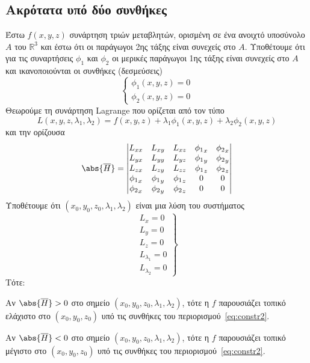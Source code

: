 \documentclass[a4paper,table]{report}
\begin{document}
\subsection{Ακρότατα υπό δύο συνθήκες}


\begin{thm}
  Έστω $ f(x,y,z) $ συνάρτηση τριών μεταβλητών, ορισμένη σε ένα ανοιχτό 
  υποσύνολο $A$ του $ \mathbb{R}^{3} $ και έστω ότι οι παράγωγοι 2ης τάξης είναι 
  συνεχείς στο $A$. Υποθέτουμε ότι για τις συναρτήσεις $ \phi _{1} $ και 
  $ \phi _{2} $ οι μερικές παράγωγοι 1ης τάξης είναι συνεχείς στο $A$ και 
  ικανοποιούνται οι συνθήκες (δεσμεύσεις) 
  \[
    \begin{cases}\label{eq:constr2}
      \phi_{1} (x,y,z) = 0 \\
      \phi_{2} (x,y,z) = 0 
    \end{cases} 
  \] 
  Θεωρούμε τη συνάρτηση Lagrange που ορίζεται από τον τύπο
  \[
    L(x,y,z, \lambda _{1}, \lambda _{2}) = f(x,y,z) + \lambda _{1} 
    \phi _{1}(x,y,z) + \lambda _{2} \phi _{2}(x,y,z) 
  \] 
  και την ορίζουσα 
  \[
    \abs{\overline{H}} = 
    \begin{vmatrix}
      L_{xx} & L_{xy} & L_{xz} & {\phi _{1}}_{x} & {\phi _{2}}_{x} \\
      L_{yx} & L_{yy} & L_{yz} & {\phi _{1}}_{y} & {\phi _{2}}_{y} \\
      L_{zx} & L_{zy} & L_{zz} & {\phi _{1}}_{z} & {\phi _{2}}_{z} \\
      {\phi _{1}}_{x} & {\phi _{1}}_{y} & {\phi _{1}}_{z} & 0 & 0 \\         
      {\phi _{2}}_{x} & {\phi _{2}}_{y} & {\phi _{2}}_{z} & 0 & 0 \\         
    \end{vmatrix} 
  \] 
  Υποθέτουμε ότι $ (x_{0}, y_{0}, z_{0}, \lambda _{1}, \lambda _{2}) $ είναι μια 
  λύση του συστήματος 
  \[
    \left.
      \begin{matrix}
        L_{x} = 0 \\
        L_{y} = 0 \\
        L_{z} = 0 \\
        L_{\lambda _{1}} = 0 \\
        L_{\lambda _{2}} = 0 
      \end{matrix}
    \right\} 
  \]
  Τότε:
  \begin{myitemize}
    \item Αν $ \abs{\overline{H}} > 0 $ στο σημείο 
      $ (x_{0}, y_{0}, z_{0}, \lambda _{1}, \lambda _{2}) $, τότε η $f$ 
      παρουσιάζει τοπικό ελάχιστο στο $ (x_{0}, y_{0}, z_{0}) $ υπό τις 
      συνθήκες του περιορισμού~\eqref{eq:constr2}.
    \item Αν $ \abs{\overline{H}} < 0 $ στο σημείο 
      $ (x_{0}, y_{0}, z_{0}, \lambda _{1}, \lambda _{2}) $, τότε η $f$ 
      παρουσιάζει τοπικό μέγιστο στο $ (x_{0}, y_{0}, z_{0}) $ υπό τις 
      συνθήκες του περιορισμού~\eqref{eq:constr2}.
  \end{myitemize}
\end{thm}
\end{document}
